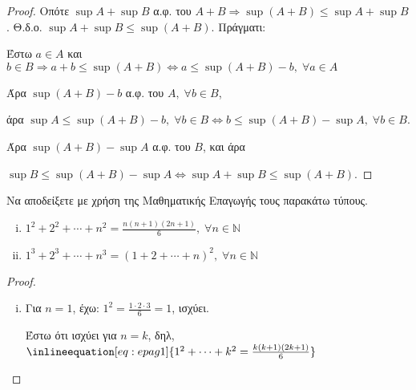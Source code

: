\begin{multicols}{2}
\begin{enumerate}
\begin{proof}
            Οπότε $ \sup A + \sup B $ α.φ. του $ A + B \Rightarrow \sup (A+B) \leq 
            \sup A + \sup B$.
            Θ.δ.ο. $ \sup A + \sup B \leq \sup (A+B) $. Πράγματι:

            Έστω $ a \in A $ και $ b \in B \Rightarrow a+b \leq \sup (A+B) 
            \Leftrightarrow a \leq \sup (A+B) - b, \; \forall a \in A $ 
            
            Άρα $ \sup (A+B) - b $ α.φ. του $A, \; \forall b \in B $, 

            άρα $ \sup A \leq \sup (A+B) - b, \; \forall b \in B \Leftrightarrow 
            b \leq \sup (A+B) - \sup A , \; \forall b \in B$. 

            Άρα $ \sup (A+B) - \sup A $ α.φ. του $B$, και άρα 

            $ \sup B \leq \sup (A+B) - \sup A \Leftrightarrow \sup A + \sup B \leq 
            \sup (A+B)$.
        \end{proof}


    \item \textcolor{Col1}{Να αποδείξετε με χρήση της Μαθηματικής Επαγωγής τους παρακάτω τύπους.
        \begin{enumerate}[i)]
            \item $ 1^{2} + 2^{2} + \cdots + n^{2} = \frac{n(n+1)(2n+1)}{6}, \; 
                \forall n \in \mathbb{N} $
            \item $ 1^{3} + 2^{3} + \cdots + n^{3} = (1+2+\cdots + n)^{2}, \; 
                \forall n \in \mathbb{N} $
    \end{enumerate}}

        \begin{proof}
        \item {}
            \begin{enumerate}[i)]
                \item Για $ n=1 $, έχω: $ 1^{2} = \frac{1\cdot 2 \cdot 3}{6} = 1 $, 
                    ισχύει.

                Έστω ότι ισχύει για $n=k$, δηλ, 
                    $ \inlineequation[eq:epag1]{1^{2} + \cdots + k^{2} = 
                    \frac{k (k+1)(2k+1)}{6}} $


\end{enumerate}
\end{proof}
\end{enumerate}
\end{multicols}
